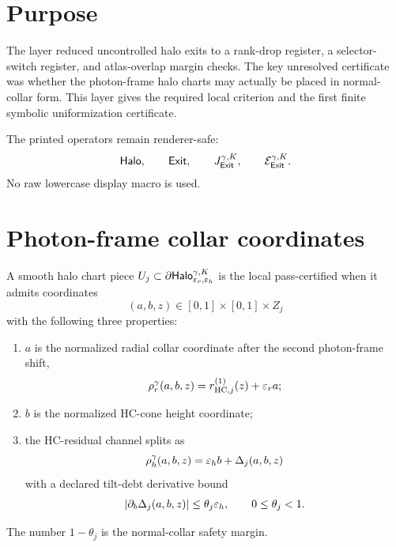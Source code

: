 \begin{abstract}
This delta layer executes the follow-up left by the local pass. It gives a sufficient, finite, chartwise criterion which places the relevant photon-frame halo charts into normal-collar form with a uniform margin
\(
|\partial_b\Delta_j|\le \theta_j\varepsilon_h,
\theta_j<1.
\)
Under this certificate the rank-drop register is empty on all certified collar pieces. The layer does not close OP5 globally. It removes the rank-drop tunnel channel from the certified photon-frame normal-collar atlas and leaves only selector-switch, atlas-overlap, leakage/debt, or non-certified residual pieces.
\end{abstract}

\section{Purpose}

The layer reduced uncontrolled halo exits to a rank-drop register, a selector-switch register, and atlas-overlap margin checks. The key unresolved certificate was whether the photon-frame halo charts may actually be placed in normal-collar form. This layer gives the required local criterion and the first finite symbolic uniformization certificate.

The printed operators remain renderer-safe:
\[
\mathsf{Halo},\qquad \mathsf{Exit},\qquad J_{\mathsf{Exit}}^{\gamma,K},\qquad \mathcal E_{\mathsf{Exit}}^{\gamma,K} .
\]
No raw lowercase display macro is used.

\section{Photon-frame collar coordinates}

\begin{definition}
A smooth halo chart piece \(U_j\subset \partial\mathsf{Halo}_{\varepsilon_r,\varepsilon_h}^{\gamma,K}\) is the local pass-certified when it admits coordinates
\[
(a,b,z)\in [0,1]\times[0,1]\times Z_j
\]
with the following three properties:
\begin{enumerate}
\item \(a\) is the normalized radial collar coordinate after the second photon-frame shift,
\[
\rho_{r}^{\gamma}(a,b,z)=r_{\mathrm{HC},j}^{(1)}(z)+\varepsilon_r a;
\]
\item \(b\) is the normalized HC-cone height coordinate;
\item the HC-residual channel splits as
\[
\rho_{h}^{\gamma}(a,b,z)=\varepsilon_h b+\Delta_j(a,b,z)
\]
with a declared tilt-debt derivative bound
\[
|\partial_b\Delta_j(a,b,z)|\le \theta_j\varepsilon_h,
\qquad 0\le \theta_j<1.
\]
\end{enumerate}
The number \(1-\theta_j\) is the normal-collar safety margin.
\end{definition}

